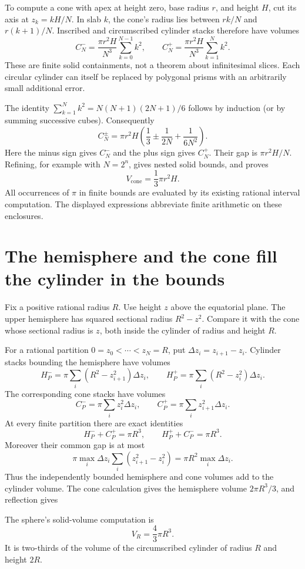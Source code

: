 To compute a cone with apex at height zero, base radius $r$, and height
$H$, cut its axis at $z_k=kH/N$.  In slab $k$, the cone's radius lies
between $rk/N$ and $r(k+1)/N$.  Inscribed and circumscribed cylinder
stacks therefore have volumes
\[
 C_N^- =\frac{\pi r^2H}{N^3}\sum_{k=0}^{N-1}k^2,
 \qquad
 C_N^+ =\frac{\pi r^2H}{N^3}\sum_{k=1}^{N}k^2.
\]
These are finite solid containments, not a theorem about infinitesimal
slices.  Each circular cylinder can itself be replaced by polygonal prisms
with an arbitrarily small additional error.

The identity
$\sum_{k=1}^{N}k^2=N(N+1)(2N+1)/6$ follows by induction (or by
summing successive cubes).  Consequently
\[
 C_N^\pm=\pi r^2H\left(\frac13\mathbin{\pm}\frac1{2N}
                              +\frac1{6N^2}\right).
\]
Here the minus sign gives $C_N^-$ and the plus sign gives $C_N^+$.
Their gap is $\pi r^2H/N$.  Refining, for example with $N=2^n$, gives
nested solid bounds, and proves
\[
 \boxed{V_{\mathrm{cone}}=\frac13\pi r^2H.}
\]
All occurrences of $\pi$ in finite bounds are evaluated by its existing
rational interval computation.  The displayed expressions abbreviate
finite arithmetic on these enclosures.

\section{The hemisphere and the cone fill the cylinder in the bounds}
\label{sec:sphere-volume-exhaustion}
Fix a positive rational radius $R$.  Use height $z$ above the equatorial
plane.  The upper hemisphere has squared sectional radius $R^2-z^2$.
Compare it with the cone whose sectional radius is $z$, both inside the
cylinder of radius and height $R$.

For a rational partition $0=z_0<\cdots<z_N=R$, put
$\Delta z_i=z_{i+1}-z_i$.  Cylinder stacks bounding the hemisphere have
volumes
\[
 H_P^-=\pi\sum_i(R^2-z_{i+1}^2)\Delta z_i,
 \qquad
 H_P^+=\pi\sum_i(R^2-z_i^2)\Delta z_i.
\]
The corresponding cone stacks have volumes
\[
 C_P^-=\pi\sum_i z_i^2\Delta z_i,
 \qquad
 C_P^+=\pi\sum_i z_{i+1}^2\Delta z_i.
\]
At every finite partition there are exact identities
\[
 \boxed{H_P^-+C_P^+=\pi R^3,
        \qquad H_P^++C_P^-=\pi R^3.}
\]
Moreover their common gap is at most
\[
 \pi\max_i\Delta z_i\sum_i(z_{i+1}^2-z_i^2)
 =\pi R^2\max_i\Delta z_i.
\]
Thus the independently bounded hemisphere and cone volumes add to the
cylinder volume.  The cone calculation gives the hemisphere volume
$2\pi R^3/3$, and reflection gives
\begin{theorem}\label{thm:sphere-volume}
The sphere's solid-volume computation is
\[
 \boxed{V_R=\frac43\pi R^3.}
\]
It is two-thirds of the volume of the circumscribed cylinder of radius
$R$ and height $2R$.
\end{theorem}

